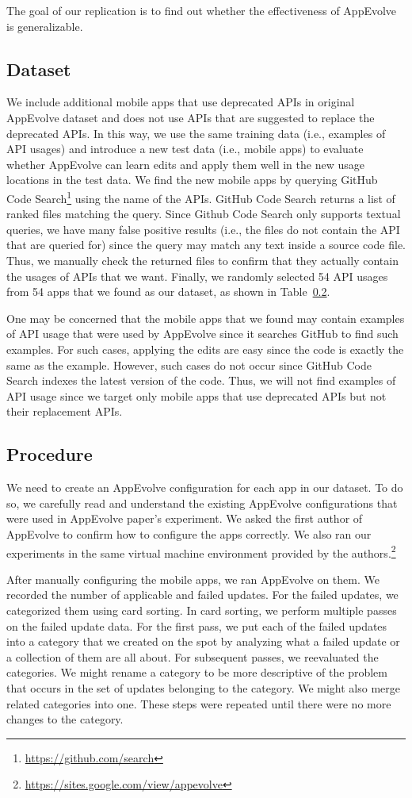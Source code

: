 The goal of our replication is to find out whether the effectiveness of AppEvolve is generalizable.
\subsection{Dataset}
We include additional mobile apps that use deprecated APIs in original AppEvolve dataset and does not use APIs that are suggested to replace the deprecated APIs. In this way, we use the same training data (i.e., examples of API usages) and introduce a new test data (i.e., mobile apps) to evaluate whether AppEvolve can learn edits and apply them well in the new usage locations in the test data. We find the new mobile apps by querying GitHub Code Search\footnote{\url{https://github.com/search}} using the name of the APIs. GitHub Code Search returns a list of ranked files matching the query. Since Github Code Search only supports textual queries, we have many false positive results (i.e., the files do not contain the API that are queried for) since the query may match any text inside a source code file. Thus, we manually check the returned files to confirm that they actually contain the usages of APIs that we want. Finally, we randomly selected 54 API usages from 54 apps that we found as our dataset, as shown in Table~\ref{}.

One may be concerned that the mobile apps that we found may contain examples of API usage that were used by AppEvolve since it searches GitHub to find such examples. For such cases, applying the edits are easy since the code is exactly the same as the example. However, such cases do not occur since GitHub Code Search indexes the latest version of the code. Thus, we will not find examples of API usage since we target only mobile apps that use deprecated APIs but not their replacement APIs.

\subsection{Procedure}
We need to create an AppEvolve configuration for each app in our dataset. To do so, we carefully read and understand the existing AppEvolve configurations that were used in AppEvolve paper's experiment. We asked the first author of AppEvolve to confirm how to configure the apps correctly. We also ran our experiments in the same virtual machine environment provided by the authors.\footnote{\url{https://sites.google.com/view/appevolve}}

After manually configuring the mobile apps, we ran AppEvolve on them. We recorded the number of applicable and failed updates. For the failed updates, we categorized them using card sorting\cite{...}. In card sorting, we perform multiple passes on the failed update data. For the first pass, we put each of the failed updates into a category that we created on the spot by analyzing what a failed update or a collection of them are all about. For subsequent passes, we reevaluated the categories. We might rename a category to be more descriptive of the problem that occurs in the set of updates belonging to the category. We might also merge related categories into one. These steps were repeated until there were no more changes to the category.